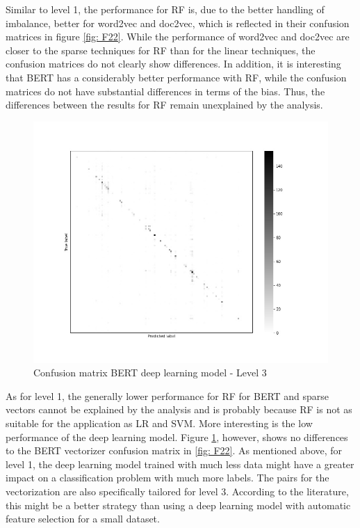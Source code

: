 \documentclass[12pt, a4paper, titlepage]{article}
\begin{document}
Similar to level 1, the performance for \ac{RF} is, due to the better handling of imbalance, better for word2vec and doc2vec, which is reflected in their confusion matrices in figure \ref{fig: F22}. While the performance of word2vec and doc2vec are closer to the sparse techniques for \ac{RF} than for the linear techniques, the confusion matrices do not clearly show differences. In addition, it is interesting that \ac{BERT} has a considerably better performance with \ac{RF}, while the confusion matrices do not have substantial differences in terms of the bias. Thus, the differences between the results for \ac{RF} remain unexplained by the analysis.

\begin{figure}[hb!]
  \center
  \includegraphics[scale=0.5]{cm_bert_clf_3.jpg}
  \caption{\label{fig: F26} Confusion matrix BERT deep learning model - Level 3}
\end{figure}

As for level 1, the generally lower performance for \ac{RF} for \ac{BERT} and sparse vectors cannot be explained by the analysis and is probably because \ac{RF} is not as suitable for the application as \ac{LR} and \ac{SVM}. More interesting is the low performance of the deep learning model. Figure \ref{fig: F26}, however, shows no differences to the \ac{BERT} vectorizer confusion matrix in \ref{fig: F22}. As mentioned above, for level 1, the deep learning model trained with much less data might have a greater impact on a classification problem with much more labels. The pairs for the vectorization are also specifically tailored for level 3. According to the literature, this might be a better strategy than using a deep learning model with automatic feature selection for a small dataset. 
\end{document}

